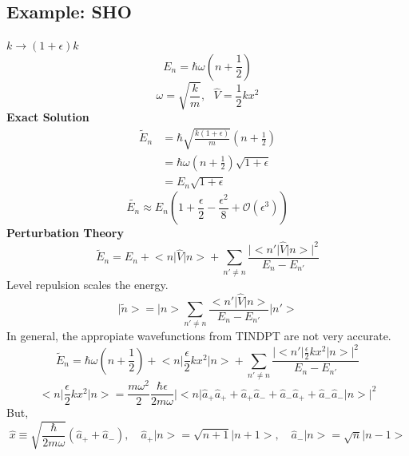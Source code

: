 \documentclass[12pt,fancychapters]{report}
\numberwithin{equation}{section}
\begin{document}
\subsection{Example: SHO}
$k \longrightarrow (1+\epsilon)k$
\begin{equation*}
	E_n = \hbar\omega \left(n+\frac{1}{2}\right)
\end{equation*}
$$\omega = \sqrt{\frac{k}{m}},\,\,\,\,\hat{V}= \frac{1}{2}kx^2$$
\textbf{Exact Solution}
\begin{align*}
	\tilde{E}_n &= \hbar\sqrt{\frac{k(1+\epsilon)}{m}}\left(n+\frac{1}{2}\right)\\
	&= \hbar\omega\left(n+\frac{1}{2}\right)\sqrt{1+\epsilon}\\
	&= E_n\sqrt{1+\epsilon}
\end{align*}
\begin{equation*}
	\boxed{\tilde{E_n} \approx E_n\left(1+\frac{\epsilon}{2}- \frac{\epsilon^2}{8}
	+\mathcal{O}(\epsilon^3)\right)}
\end{equation*}
\textbf{Perturbation Theory}
\begin{equation*}
	\tilde{E}_n = E_n+\big<n\big|\hat{V}\big|n\big>+\sum_{n'\neq n}\frac{\big|\big<n'\big|\hat{V}
	\big|n\big>\big|^2}{E_n-E_{n'}}
\end{equation*}
Level repulsion scales the energy.
\begin{equation*}
	\big|\tilde{n}\big> = \big|n\big> \sum_{n'\neq n}\frac{\big<n'\big|\hat{V}\big|n\big>}{E_n-E_{n'}}
	\big|n'\big>
\end{equation*}
In general, the appropiate wavefunctions from TINDPT are not very accurate.
\begin{equation*}
	\tilde{E}_n = \hbar\omega\left(n+\frac{1}{2}\right)+\big<n\big|\frac{\epsilon}{2}kx^2\big|n\big>
	+ \sum_{n'\neq n} \frac{\big|\big<n'\big|\frac{\epsilon}{2}kx^2\big|n\big>\big|^2}{E_n-E_{n'}}
\end{equation*}
\begin{equation*}
	\big<n\big|\frac{\epsilon}{2}kx^2\big|n\big> = \frac{m\omega^2}{2}\frac{\hbar\epsilon}{2m\omega}
	\big| \big<n\big|\hat{a}_+ \hat{a}_+ + \hat{a}_+ \hat{a}_- + 
	\hat{a}_- \hat{a}_+ +\hat{a}_-\hat{a}_-\big|n\big>\big|^2
\end{equation*}
But,
\begin{equation*}
	\hat{x}\equiv \sqrt{\frac{\hbar}{2m\omega}}\left(\hat{a}_+ + \hat{a}_-\right),\,\,\,\,\,\,
	\hat{a}_+\big|n\big> = \sqrt{n+1}\big|n+1\big>,\,\,\,\,\,\,\hat{a}_-\big|n\big>=\sqrt{n}\big|n-1\big>
\end{equation*}
\end{document}
